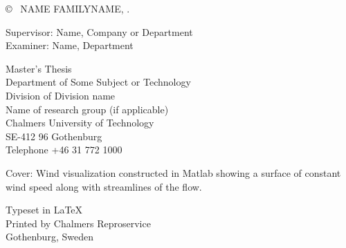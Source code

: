 \copyright ~ NAME FAMILYNAME, \the\year. \setlength{\parskip}{1cm}

Supervisor: Name, Company or Department\\
Examiner: Name, Department \setlength{\parskip}{1cm}

Master's Thesis \the\year\\	
Department of Some Subject or Technology\\
Division of Division name\\
Name of research group (if applicable)\\
Chalmers University of Technology\\
SE-412 96 Gothenburg\\
Telephone +46 31 772 1000 \setlength{\parskip}{0.5cm}

\vfill
Cover: Wind visualization constructed in Matlab showing a surface of constant wind speed along with streamlines of the flow. \setlength{\parskip}{0.5cm}

Typeset in \LaTeX \tagtemp\\
Printed by Chalmers Reproservice\\
Gothenburg, Sweden \the\year
